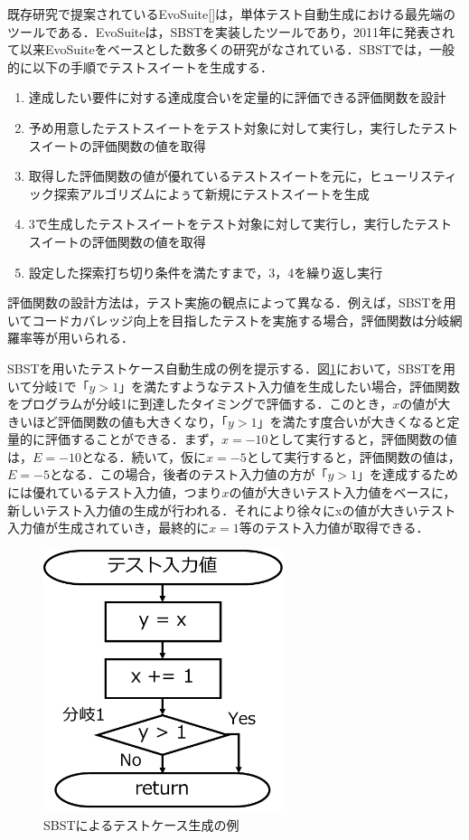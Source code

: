 \documentclass[12pt]{jarticle} %
\begin{document}
既存研究で提案されているEvoSuite[]は，単体テスト自動生成における最先端のツールである．EvoSuiteは，SBSTを実装したツールであり，2011年に発表されて以来EvoSuiteをベースとした数多くの研究がなされている．SBSTでは，一般的に以下の手順でテストスイートを生成する．

\begin{enumerate}
  \item 達成したい要件に対する達成度合いを定量的に評価できる評価関数を設計
  \item 予め用意したテストスイートをテスト対象に対して実行し，実行したテストスイートの評価関数の値を取得
  \item 取得した評価関数の値が優れているテストスイートを元に，ヒューリスティック探索アルゴリズムによぅて新規にテストスイートを生成
  \item 3で生成したテストスイートをテスト対象に対して実行し，実行したテストスイートの評価関数の値を取得
  \item 設定した探索打ち切り条件を満たすまで，3，4を繰り返し実行
\end{enumerate}

評価関数の設計方法は，テスト実施の観点によって異なる．例えば，SBSTを用いてコードカバレッジ向上を目指したテストを実施する場合，評価関数は分岐網羅率等が用いられる．

SBSTを用いたテストケース自動生成の例を提示する．図\ref{SBST}において，SBSTを用いて分岐1で「$y > 1$」を満たすようなテスト入力値を生成したい場合，評価関数をプログラムが分岐1に到達したタイミングで評価する．このとき，$x$の値が大きいほど評価関数の値も大きくなり，「$y > 1$」を満たす度合いが大きくなると定量的に評価することができる．まず，$x = -10$として実行すると，評価関数の値は，$E = -10$となる．続いて，仮に$x = -5$として実行すると，評価関数の値は，$E = -5$となる．この場合，後者のテスト入力値の方が「$y > 1$」を達成するためには優れているテスト入力値，つまり$x$の値が大きいテスト入力値をベースに，新しいテスト入力値の生成が行われる．それにより徐々にxの値が大きいテスト入力値が生成されていき，最終的に$x = 1$等のテスト入力値が取得できる．

\begin{figure}[htbp]
  \begin{center}
    \includegraphics[clip,width=7cm]{SBST.pdf}
    \caption{SBSTによるテストケース生成の例}
    \label{SBST}
  \end{center}
\end{figure}
\end{document}
